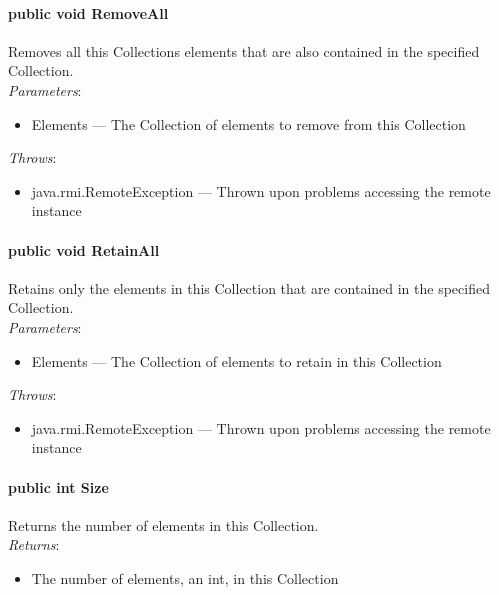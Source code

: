 \documentclass[$Date: 2003/06/26 19:29:31 $]{glabarticle}
\begin{document}
\paragraph{public void RemoveAll}

Removes all this Collections elements that are also contained in the
specified Collection.\\

\textit{Parameters}:
\begin{itemize}
\item[] Elements --- The Collection of elements to remove from this Collection 
\end{itemize}

 \textit{Throws}:
 \begin{itemize}
 \item[] java.rmi.RemoteException --- Thrown upon problems accessing the remote instance 
 \end{itemize}

\paragraph{public void RetainAll}

Retains only the elements in this Collection that are contained in the
specified Collection.\\

\textit{Parameters}:
\begin{itemize}
\item[] Elements --- The Collection of elements to retain in this Collection 
\end{itemize}

 \textit{Throws}:
 \begin{itemize}
 \item[] java.rmi.RemoteException --- Thrown upon problems accessing the remote instance 
 \end{itemize}

\paragraph{public int Size}

Returns the number of elements in this Collection.\\

\textit{Returns}:
\begin{itemize}
\item[] The number of elements, an int, in this Collection
\end{itemize}
\end{document}
